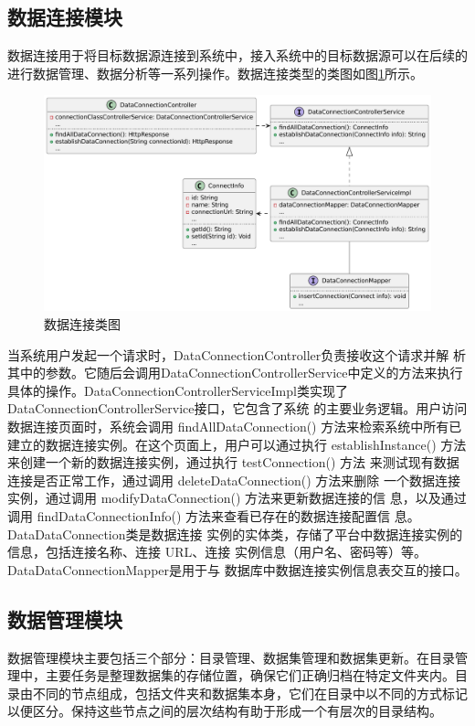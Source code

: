 \subsection{数据连接模块}
数据连接用于将目标数据源连接到系统中，接入系统中的目标数据源可以在后续的进行数据管理、数据分析等一系列操作。数据连接类型的类图如图\ref{fig:dataconneclass}所示。
\begin{figure}[H]
    \centering
    \caption{数据连接类图}
    \label{fig:dataconneclass}
    \includegraphics[width=.9\linewidth]{figure/数据连接类图.pdf}
\end{figure}
当系统用户发起一个请求时，DataConnectionController负责接收这个请求并解
析其中的参数。它随后会调用DataConnectionControllerService中定义的方法来执行具体的操作。DataConnectionControllerServiceImpl类实现了DataConnectionControllerService接口，它包含了系统
的主要业务逻辑。用户访问数据连接页面时，系统会调用 findAllDataConnection()
方法来检索系统中所有已建立的数据连接实例。在这个页面上，用户可以通过执行
establishInstance() 方法来创建一个新的数据连接实例，通过执行 testConnection() 方法
来测试现有数据连接是否正常工作，通过调用 deleteDataConnection() 方法来删除
一个数据连接实例，通过调用 modifyDataConnection() 方法来更新数据连接的信
息，以及通过调用 findDataConnectionInfo() 方法来查看已存在的数据连接配置信
息。DataDataConnection类是数据连接
实例的实体类，存储了平台中数据连接实例的信息，包括连接名称、连接 URL、连接
实例信息（用户名、密码等）等。DataDataConnectionMapper是用于与
数据库中数据连接实例信息表交互的接口。
\subsection{数据管理模块}
数据管理模块主要包括三个部分：目录管理、数据集管理和数据集更新。在目录管理中，主要任务是整理数据集的存储位置，确保它们正确归档在特定文件夹内。目录由不同的节点组成，包括文件夹和数据集本身，它们在目录中以不同的方式标记以便区分。保持这些节点之间的层次结构有助于形成一个有层次的目录结构。

